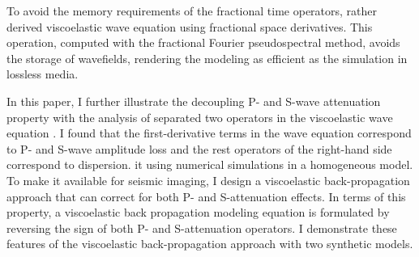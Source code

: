 To avoid the memory requirements of the fractional time operators, \citet[]{zhu14c}rather derived viscoelastic wave equation using fractional space derivatives. This operation, computed with the fractional Fourier pseudospectral method, avoids the storage of wavefields, rendering the modeling as efficient as the simulation in lossless media. 

In this paper, I further illustrate the decoupling P- and S-wave attenuation property with the analysis of separated two operators in the viscoelastic wave equation \cite[]{zhu14c}. I found that the first-derivative terms in the wave equation correspond to P- and S-wave amplitude loss and the rest operators of the right-hand side correspond to dispersion. it using numerical simulations in a homogeneous model. To make it available for seismic imaging, I design a viscoelastic back-propagation approach that can correct for both P- and S-attenuation effects. In terms of this property, a viscoelastic back propagation modeling equation is formulated by reversing the sign of both P- and S-attenuation operators. I demonstrate these features of the viscoelastic back-propagation approach with two synthetic models. 

